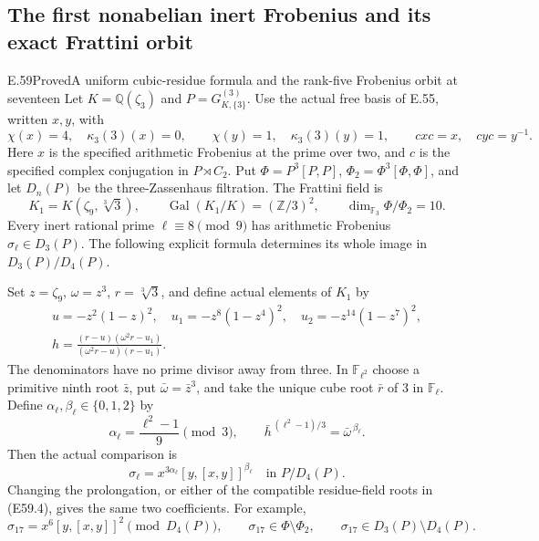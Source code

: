 \subsection{The first nonabelian inert Frobenius and its exact Frattini orbit}

\begin{statement}{E.59}{Proved}{A uniform cubic-residue formula and the rank-five Frobenius orbit at seventeen}
Let $K=\mathbb Q(\zeta_3)$ and
$P=G_{K,\{3\}}^{(3)}$. Use the actual free basis of
E.55, written $x,y$, with
\[
 \chi(x)=4,\quad\kappa_3(3)(x)=0,\qquad
 \chi(y)=1,\quad\kappa_3(3)(y)=1,\qquad
 cxc=x,\quad cyc=y^{-1}.
 \tag{E59.1}
\]
Here $x$ is the specified arithmetic Frobenius at the
prime over two, and $c$ is the specified complex
conjugation in $P\rtimes C_2$.
Put $\Phi=P^3[P,P]$, $\Phi_2=\Phi^3[\Phi,\Phi]$,
and let $D_n(P)$ be the three-Zassenhaus filtration.
The Frattini field is
\[
 K_1=K(\zeta_9,\sqrt[3]{3}),\qquad
 \operatorname{Gal}(K_1/K)=(\mathbb Z/3)^2,\qquad
 \dim_{\mathbb F_3}\Phi/\Phi_2=10.
 \tag{E59.2}
\]
Every inert rational prime $\ell\equiv8\pmod9$
has arithmetic Frobenius $\sigma_\ell\in D_3(P)$.
The following explicit formula determines its
whole image in $D_3(P)/D_4(P)$.

Set $z=\zeta_9$, $\omega=z^3$, $r=\sqrt[3]{3}$,
and define actual elements of $K_1$ by
\[
 \begin{gathered}
 u=-z^2(1-z)^2,\quad
 u_1=-z^8(1-z^4)^2,\quad
 u_2=-z^{14}(1-z^7)^2,\\
 h=\frac{(r-u)(\omega^2r-u_1)}
          {(\omega^2r-u)(r-u_1)}.
 \end{gathered}
 \tag{E59.3}
\]
The denominators have no prime divisor away
from three. In $\mathbb F_{\ell^2}$ choose a
primitive ninth root $\bar z$, put
$\bar\omega=\bar z^3$, and take the unique
cube root $\bar r$ of $3$ in $\mathbb F_\ell$.
Define $\alpha_\ell,\beta_\ell\in\{0,1,2\}$ by
\[
 \alpha_\ell=\frac{\ell^2-1}{9}\pmod3,\qquad
 \bar h^{\,(\ell^2-1)/3}=\bar\omega^{\,\beta_\ell}.
 \tag{E59.4}
\]
Then the actual comparison is
\[
 \boxed{\quad
 \sigma_\ell
   =x^{3\alpha_\ell}[y,[x,y]]^{\beta_\ell}
                  \quad\text{in }P/D_4(P).
 \quad}
 \tag{E59.5}
\]
Changing the prolongation, or either of the
compatible residue-field roots in (E59.4), gives
the same two coefficients.
For example,
\[
 \sigma_{17}=x^6[y,[x,y]]^2\pmod{D_4(P)},\qquad
 \sigma_{17}\in\Phi\setminus\Phi_2,\qquad
 \sigma_{17}\in D_3(P)\setminus D_4(P).
 \tag{E59.6}
\]


\end{statement}
